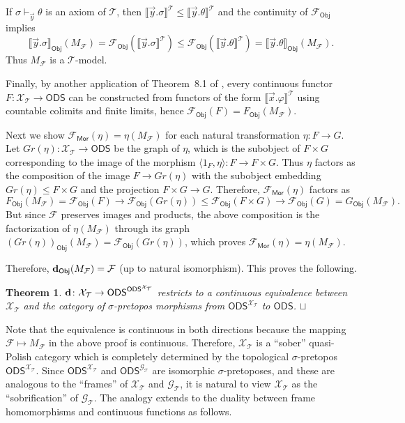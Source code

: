 \documentclass{article}
\theoremstyle{plain}
\newtheorem{theorem}[Theorem]{Theorem}
\def\squareforqed{\hbox{\rlap{$\sqcap$}$\sqcup$}}
\def\qed{\ifmmode\squareforqed\else{\unskip\nobreak\hfil
\penalty50\hskip1em\null\nobreak\hfil\squareforqed
\parfillskip=0pt\finalhyphendemerits=0\endgraf}\fi}
\def\cal#1{{\mathcal #1}}
\def\calF{{\cal F}}
\def\calG{{\cal G}}
\def\calT{{\cal T}}
\def\calX{{\cal X}}
\newcommand{\ODS}{{\mathsf{ODS}}}
\newcommand{\y}{{\mathsf{\bf d}}}
\newcommand{\Mor}{\mathsf{Mor}}
\newcommand{\Obj}{\mathsf{Obj}}
\begin{document}
If $\sigma \vdash_{\vec{y}} \theta$ is an axiom of $\calT$, then $\llbracket \vec{y}.\sigma \rrbracket^\calT \leq \llbracket \vec{y}.\theta \rrbracket^\calT$ and the continuity of $\calF_\Obj$ implies 
\[\llbracket \vec{y}.\sigma\rrbracket_\Obj( M_\calF) = \calF_\Obj(\llbracket \vec{y}.\sigma \rrbracket^\calT) \leq \calF_\Obj(\llbracket \vec{y}.\theta \rrbracket^\calT)=\llbracket \vec{y}.\theta\rrbracket_\Obj( M_\calF).\] 
Thus $M_{\calF}$ is a $\calT$-model. 

Finally, by another application of Theorem~8.1 of \cite{Chen19}, every continuous functor $F\colon \calX_\calT \to\ODS$ can be constructed from functors of the form $\llbracket \vec{x}.\varphi\rrbracket^\calT$ using countable colimits and finite limits, hence $\calF_\Obj(F) = F_\Obj(M_\calF)$. 

Next we show $\calF_\Mor(\eta)=\eta(M_\calF)$ for each natural transformation $\eta\colon F\to G$. Let $Gr(\eta)\colon \calX_\calT\to\ODS$ be the graph of $\eta$, which is the subobject of $F\times G$ corresponding to the image of the morphism $\langle 1_F, \eta\rangle \colon F\to F\times G$. Thus $\eta$ factors as the composition of the image $F\to Gr(\eta)$ with the subobject embedding $Gr(\eta)\leq F\times G$ and the projection $F\times G \to G$. Therefore, $\calF_\Mor(\eta)$ factors as 
\[F_\Obj(M_\calF)=\calF_\Obj(F)\to \calF_\Obj(Gr(\eta))\leq \calF_\Obj(F\times G)\to\calF_\Obj(G)=G_\Obj(M_\calF).\] 
But since $\calF$ preserves images and products, the above composition is the factorization of $\eta(M_\calF)$ through its graph $(Gr(\eta))_\Obj(M_\calF)=\calF_\Obj(Gr(\eta))$, which proves $\calF_\Mor(\eta)=\eta(M_\calF)$.

Therefore, $\y_\Obj(M_\calF) = \calF$ (up to natural isomorphism). This proves the following.

\begin{theorem}\label{thm:XTsober}
$\y\colon \calX_\calT\to \ODS^{\ODS^{\calX_\calT}}$ restricts to a continuous equivalence between $\calX_\calT$ and the category of $\sigma$-pretopos morphisms from $\ODS^{\calX_\calT}$ to $\ODS$.
\qed
\end{theorem}

Note that the equivalence is continuous in both directions because the mapping $\calF \mapsto M_\calF$ in the above proof is continuous. Therefore, $\calX_\calT$ is a ``sober'' quasi-Polish category which is completely determined by the topological $\sigma$-pretopos $\ODS^{\calX_\calT}$. Since $\ODS^{\calX_\calT}$ and $\ODS^{\calG_\calT}$ are isomorphic $\sigma$-pretoposes, and these are analogous to the ``frames'' of $\calX_\calT$ and $\calG_\calT$, it is natural to view $\calX_\calT$ as the ``sobrification'' of $\calG_\calT$. The analogy extends to the duality between frame homomorphisms and continuous functions as follows.
\end{document}

